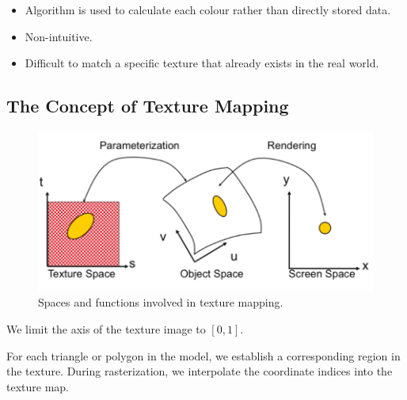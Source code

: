 \documentclass[11pt]{article}
\begin{document}
\begin{itemize}
  \item Algorithm is used to calculate each colour rather than directly stored data.
  \item Non-intuitive.
  \item Difficult to match a specific texture that already exists in the real world.
\end{itemize}

\subsection{The Concept of Texture Mapping}
\begin{figure}[htb!]
  \centering
  \caption{Spaces and functions involved in texture mapping.}
  \includegraphics[scale=0.3]{texturemapping}
\end{figure}
We limit the axis of the texture image to $[0, 1]$.

For each triangle or polygon in the model, we establish a corresponding region in the texture.
During rasterization, we interpolate the coordinate indices into the texture map.
\end{document}
